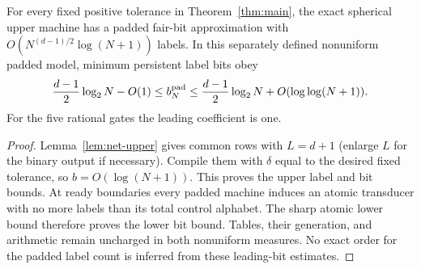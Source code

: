 \begin{corollary}\label{cor:coin-rate}
For every fixed positive tolerance in Theorem~\ref{thm:main}, the exact
spherical upper machine has a padded fair-bit approximation with
$O(N^{(d-1)/2}\log(N+1))$ labels. In this separately defined nonuniform
padded model, minimum persistent label bits obey
\[
 \frac{d-1}{2}\log_2N-O(1)
 \le b_N^{\rm pad}
 \le\frac{d-1}{2}\log_2N+O(\log\log(N+1)).
\]
For the five rational gates the leading coefficient is one.
\end{corollary}
\begin{proof}
Lemma~\ref{lem:net-upper} gives common rows with $L=d+1$ (enlarge $L$
for the binary output if necessary). Compile them with $\delta$ equal
to the desired fixed tolerance, so $b=O(\log(N+1))$. This proves the
upper label and bit bounds. At ready boundaries every padded machine
induces an atomic transducer with no more labels than its total control
alphabet. The sharp atomic lower bound therefore proves the lower bit
bound. Tables, their generation, and arithmetic remain uncharged in both
nonuniform measures. No exact order for the padded label count is inferred
from these leading-bit estimates.
\end{proof}
